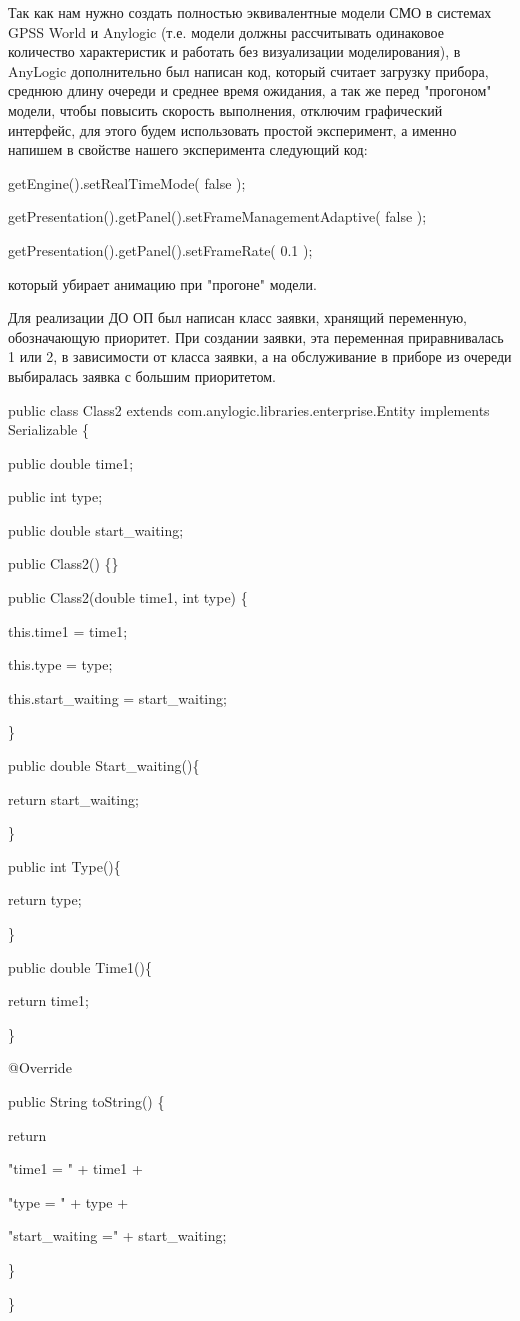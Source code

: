 \documentclass[a4paper,14pt]{report} %
\begin{document}
Так как нам нужно создать полностью эквивалентные модели СМО в системах GPSS World и Anylogic (т.е. модели должны рассчитывать одинаковое количество характеристик и работать без визуализации моделирования), в AnyLogic дополнительно был написан код, который считает загрузку прибора, среднюю длину очереди и среднее время ожидания, а так же перед "прогоном" модели, чтобы повысить скорость выполнения, отключим графический интерфейс, для этого будем использовать простой эксперимент, а именно напишем в свойстве нашего эксперимента следующий код:\par
getEngine().setRealTimeMode( false );\par
getPresentation().getPanel().setFrameManagementAdaptive( false );\par
getPresentation().getPanel().setFrameRate( 0.1 );\par\noindent
который убирает анимацию при "прогоне" модели.

Для реализации ДО ОП был написан класс заявки, хранящий переменную, обозначающую приоритет. При создании заявки, эта переменная приравнивалась 1 или 2, в зависимости от класса заявки, а на обслуживание в приборе из очереди выбиралась заявка с большим приоритетом. 
\vspace{0.5cm} \par\noindent
public class Class2 extends com.anylogic.libraries.enterprise.Entity implements Serializable \{\par\noindent
public double time1;\par\noindent
public int type;\par\noindent
public double start\_waiting;\par\noindent
public Class2() \{\}\par\noindent
public Class2(double time1, int type) \{\par
this.time1 = time1;\par
this.type = type;\par\noindent
this.start\_waiting = start\_waiting;\par\noindent
\} \par\noindent
public double Start\_waiting()\{\par
return start\_waiting;\par\noindent
\}\par\noindent
public int Type()\{\par
return type;\par\noindent
\}\par\noindent
public double Time1()\{\par
return time1;\par\noindent
\}\par\noindent
@Override\par\noindent
public String toString() \{\par
return  \par
"time1 = " + time1 + \par
"type = " + type + \par
"start\_waiting =" + start\_waiting; \par
\}\par\noindent
\}\par
\end{document}
